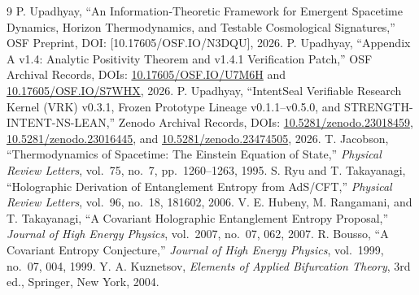 \documentclass[11pt,a4paper]{article}
\theoremstyle{remark}
\begin{document}
{\footnotesize
\begin{thebibliography}{9}
\setlength{\itemsep}{0pt}\setlength{\parskip}{0pt}
 P. Upadhyay, ``An Information-Theoretic Framework for Emergent Spacetime Dynamics, Horizon Thermodynamics, and Testable Cosmological Signatures,'' OSF Preprint, DOI: [10.17605/OSF.IO/N3DQU], 2026.
 P. Upadhyay, ``Appendix A v1.4: Analytic Positivity Theorem and v1.4.1 Verification Patch,'' OSF Archival Records, DOIs: \href{https://doi.org/10.17605/OSF.IO/U7M6H}{10.17605/OSF.IO/U7M6H} and \href{https://doi.org/10.17605/OSF.IO/S7WHX}{10.17605/OSF.IO/S7WHX}, 2026.
 P. Upadhyay, ``IntentSeal Verifiable Research Kernel (VRK) v0.3.1, Frozen Prototype Lineage v0.1.1--v0.5.0, and STRENGTH-INTENT-NS-LEAN,'' Zenodo Archival Records, DOIs: \href{https://doi.org/10.5281/zenodo.23018459}{10.5281/zenodo.23018459}, \href{https://doi.org/10.5281/zenodo.23016445}{10.5281/zenodo.23016445}, and \href{https://doi.org/10.5281/zenodo.23474505}{10.5281/zenodo.23474505}, 2026.
 T. Jacobson, ``Thermodynamics of Spacetime: The Einstein Equation of State,'' \textit{Physical Review Letters}, vol.~75, no.~7, pp.~1260--1263, 1995.
 S. Ryu and T. Takayanagi, ``Holographic Derivation of Entanglement Entropy from AdS/CFT,'' \textit{Physical Review Letters}, vol.~96, no.~18, 181602, 2006.
 V. E. Hubeny, M. Rangamani, and T. Takayanagi, ``A Covariant Holographic Entanglement Entropy Proposal,'' \textit{Journal of High Energy Physics}, vol.~2007, no.~07, 062, 2007.
 R. Bousso, ``A Covariant Entropy Conjecture,'' \textit{Journal of High Energy Physics}, vol.~1999, no.~07, 004, 1999.
 Y. A. Kuznetsov, \textit{Elements of Applied Bifurcation Theory}, 3rd ed., Springer, New York, 2004.
\end{thebibliography}
}
\end{document}
